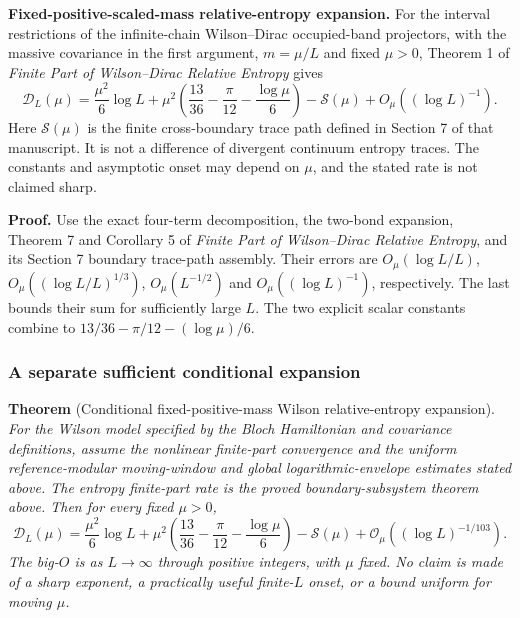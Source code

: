 \documentclass[
  10pt,
  a4paper,
]{article}
\begin{document}
\textbf{Fixed-positive-scaled-mass relative-entropy expansion.} For the interval restrictions of the infinite-chain Wilson--Dirac occupied-band projectors, with the massive covariance in the first argument, \(m=\mu/L\) and fixed \(\mu>0\), Theorem 1 of \emph{Finite Part of Wilson--Dirac Relative Entropy} gives \[\mathcal D_L(\mu)=\frac{\mu^2}{6}\log L+\mu^2\left(\frac{13}{36}-\frac{\pi}{12}-\frac{\log\mu}{6}\right)-\mathcal S(\mu)+O_\mu((\log L)^{-1}).\] Here \(\mathcal S(\mu)\) is the finite cross-boundary trace path defined in Section 7 of that manuscript. It is not a difference of divergent continuum entropy traces. The constants and asymptotic onset may depend on \(\mu\), and the stated rate is not claimed sharp.

\textbf{Proof.} Use the exact four-term decomposition, the two-bond expansion, Theorem 7 and Corollary 5 of \emph{Finite Part of Wilson--Dirac Relative Entropy}, and its Section 7 boundary trace-path assembly. Their errors are \(O_\mu(\log L/L)\), \(O_\mu((\log L/L)^{1/3})\), \(O_\mu(L^{-1/2})\) and \(O_\mu((\log L)^{-1})\), respectively. The last bounds their sum for sufficiently large \(L\). The two explicit scalar constants combine to \(13/36-\pi/12-(\log\mu)/6\).

\subsubsection{A separate sufficient conditional expansion}\label{a-separate-sufficient-conditional-expansion}

\label{thm:main}
\textbf{Theorem} (Conditional fixed-positive-mass Wilson relative-entropy expansion). \emph{For the Wilson model specified by the Bloch Hamiltonian and covariance definitions, assume the nonlinear finite-part convergence and the uniform reference-modular moving-window and global logarithmic-envelope estimates stated above. The entropy finite-part rate is the proved boundary-subsystem theorem above. Then for every fixed \(\mu>0\), \begin{equation}
\label{eq:main}
\boxed{\mathcal D_L(\mu)=\frac{\mu^2}{6}\log L+
\mu^2\left(\frac{13}{36}-\frac\pi{12}-\frac{\log\mu}{6}\right)-\mathcal S(\mu)+\mathcal O_\mu((\log L)^{-1/103}).}
\end{equation} The big-\(O\) is as \(L\to\infty\) through positive integers, with \(\mu\) fixed. No claim is made of a sharp exponent, a practically useful finite-\(L\) onset, or a bound uniform for moving \(\mu\).}
\end{document}
